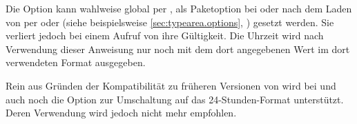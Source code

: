 Die Option kann wahlweise global per
, als Paketoption bei
 oder nach dem Laden von
 per  oder
 (siehe beispielsweise
\autoref{sec:typearea.options}, )
gesetzt werden. Sie verliert jedoch bei einem Aufruf von
 ihre Gültigkeit. Die Uhrzeit wird nach
Verwendung dieser Anweisung nur noch mit dem dort angegebenen Wert im dort
verwendeten Format ausgegeben.

Rein aus Gründen der Kompatibilität zu früheren Versionen
von  wird bei  und
 auch noch die Option  zur
Umschaltung auf das 24-Stunden-Format unterstützt. Deren Verwendung wird
jedoch nicht mehr empfohlen.%
\EndIndexGroup
%
\EndIndexGroup


